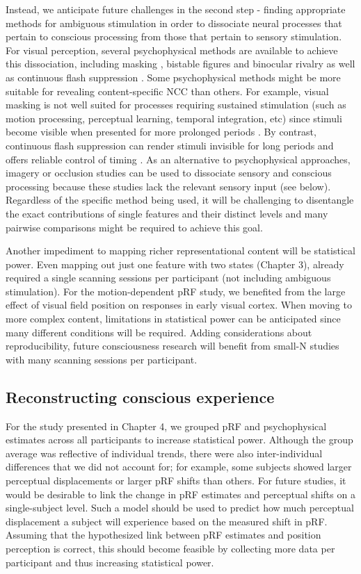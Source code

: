 Instead, we anticipate future challenges in the second step - finding appropriate methods for ambiguous stimulation in order to dissociate neural processes that pertain to conscious processing from those that pertain to sensory stimulation. For visual perception, several psychophysical methods are available to achieve this dissociation, including masking \parencite{Kouider2007, Breitmeyer2010}, bistable figures and binocular rivalry \parencite{Kim2005} as well as continuous flash suppression \parencite{Tsuchiya2005}. Some psychophysical methods might be more suitable for revealing content-specific NCC than others. For example, visual masking is not well suited for processes requiring sustained stimulation (such as motion processing, perceptual learning, temporal integration, etc) since stimuli become visible when presented for more prolonged periods \parencite{Faivre2014}. By contrast, continuous flash suppression can render stimuli invisible for long periods and offers reliable control of timing \parencite{Tsuchiya2005, Faivre2014}. As an alternative to psychophysical approaches, imagery or occlusion \parencite{Muckli2015} studies can be used to dissociate sensory and conscious processing because these studies lack the relevant sensory input (see below). Regardless of the specific method being used, it will be challenging to disentangle the exact contributions of single features and their distinct levels and many pairwise comparisons might be required to achieve this goal.

Another impediment to mapping richer representational content will be statistical power. Even mapping out just one feature with two states (Chapter 3), already required a single scanning sessions per participant (not including ambiguous stimulation). For the motion-dependent pRF study, we benefited from the large effect of visual field position on responses in early visual cortex. When moving to more complex content, limitations in statistical power can be anticipated since many different conditions will be required. Adding considerations about reproducibility, future consciousness research will benefit from small-N studies with many scanning sessions per participant.

\subsection{Reconstructing conscious experience}
For the study presented in Chapter 4, we grouped pRF and psychophysical estimates across all participants to increase statistical power. Although the group average was reflective of individual trends, there were also inter-individual differences that we did not account for; for example, some subjects showed larger perceptual displacements or larger pRF shifts than others. For future studies, it would be desirable to link the change in pRF estimates and perceptual shifts on a single-subject level. Such a model should be used to predict how much perceptual displacement a subject will experience based on the measured shift in pRF. Assuming that the hypothesized link between pRF estimates and position perception is correct, this should become feasible by collecting more data per participant and thus increasing statistical power.

